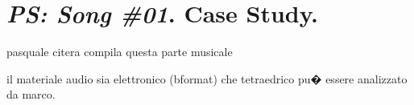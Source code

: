 \documentclass{article}
\begin{document}
\section{\emph{PS: Song \#01}. Case Study.}
\label{sec:ps01}

pasquale citera compila questa parte musicale

il materiale audio sia elettronico (bformat) che tetraedrico pu� essere analizzato da marco.

%
%
%
\end{document}
